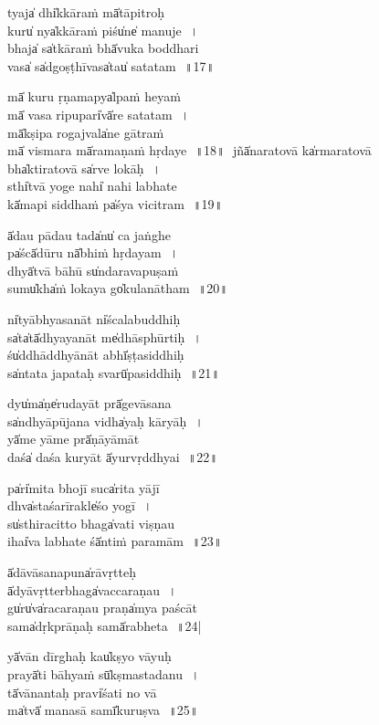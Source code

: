 \documentclass[parskip, DIV=14, pagenumber=head,top]{scrartcl}
\begin{document}
tya॒ja̍ dhi̍kkāraṁ mā̍tāpitroḥ\\
ku॒ru̍ nya̍kkāraṁ pi॒śu̍ne̍ manuje\,~।\\
bha॒ja̍ sa̍tkāraṁ bhā̍vuka boddhari\\
va॒sa̍ sa̍dgoṣṭhīva॒sa̍tau̍ satatam\,~॥17॥

\newpage 

mā̍ kuru ṛṇamapya̍lpaṁ heyaṁ\\
mā̍ vasa ripupa॒ri̍vā̍re satatam\,~।\\
mā̍kṣipa rogajva॒la̍ne gātraṁ\\
mā̍ vismara mā̍ramaṇaṁ hṛdaye\,~॥18॥
jñā̍naratovā ka̍rmaratovā\\
bha̍ktiratovā sa̍rve lokāḥ\,~।\\
sthi̍tvā yoge na॒hi̍ nahi labhate\\
kā̍mapi siddhaṁ pa̍śya vicitram\,~॥19॥

ā̍dau pādau ta॒da̍nu̍ ca jaṅghe\\
pa̍ścā̍dūru nā̍bhiṁ hṛdayam\,~।\\
dhyā̍tvā bāhū su̍ndaravapuṣaṁ\\
su॒mu̍kha̍ṁ lokaya॒ go̍kulanātham\,~॥20॥

ni̍tyābhyasanāt ni̍ścalabuddhiḥ\\
sa̍ta̍tā̍dhyayanāt me̍dhāsphūrtiḥ\,~।\\
śu̍ddhāddhyānāt a॒bhī̍ṣṭasiddhiḥ\\
sa̍ntata japataḥ sva॒rū̍pasiddhiḥ\,~॥21॥

dyu̍ma̍ṇe̍rudayāt prā̍gevāsana\\
sa̍ndhyāpūjana vi॒dha̍yaḥ kāryāḥ\,~।\\
yā̍me yāme prā̍ṇāyāmāt\\
da॒śa̍ daśa kuryāt ā̍yurvṛddhyai\,~॥22॥

pa̍ri̍mita bhojī su॒ca̍rita yājī\\
dhva̍staśarīrakle̍śo yogī\,~।\\
su̍sthiracitto bha॒ga̍vati viṣṇau\\
i॒hai̍va labhate śā̍ntiṁ paramām\,~॥23॥

\newpage 

ā̍dāvāsanapu॒na̍rāvṛtteḥ\\
ā̍dyāvṛtterbha॒ga̍vaccaraṇau\,~।\\
gu̍ru̍va̍racaraṇau pra॒ṇa̍mya paścāt\\
sa॒ma̍dṛkprāṇaḥ sa॒mā̍rabheta\,~॥24|

yā̍vān dīrghaḥ kau̍kṣyo vāyuḥ\\
pra॒yā̍ti bāhyaṁ sū̍kṣmastadanu\,~।\\
tā̍vānantaḥ pra॒vi̍śati no vā\\
ma̍tvā̍ manasā sa॒mī̍kuruṣva\,~॥25॥
\end{document}
